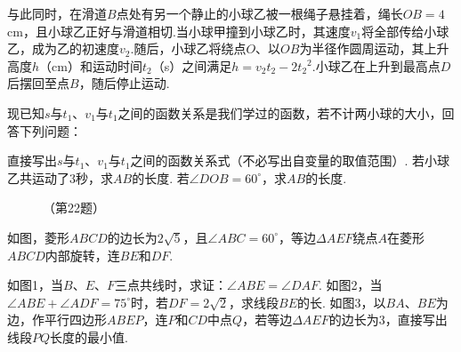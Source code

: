 \documentclass[10pt]{article}
\begin{document}
\begin{questions}{\answeringintroduction}
\begin{table}[!htbp]
    \end{table}\par
    \qquad 与此同时，在滑道$B$点处有另一个静止的小球乙被一根绳子悬挂着，绳长$OB=4$cm，且小球乙正好与滑道相切.当小球甲撞到小球乙时，其速度$v_1$将全部传给小球乙，成为乙的初速度$v_2$.随后，小球乙将绕点$O$、以$OB$为半径作圆周运动，其上升高度$h$（cm）和运动时间$t_2$（s）之间满足$h=v_2t_2-2{t_2}^2$.小球乙在上升到最高点$D$后摆回至点$B$，随后停止运动.\par
    \qquad 现已知$s$与$t_1$、$v_1$与$t_1$之间的函数关系是我们学过的函数，若不计两小球的大小，回答下列问题：
    \begin{subquestions}
        \subquestion 直接写出$s$与$t_1$、$v_1$与$t_1$之间的函数关系式（不必写出自变量的取值范围）.
        \subquestion 若小球乙共运动了$3$秒，求$AB$的长度.
        \subquestion 若$\angle DOB=60^{\circ}$，求$AB$的长度.
    \end{subquestions}
    \begin{figure}[!htbp]
        \centering
        \caption*{（第22题）}
    \end{figure}
    \question 如图，菱形$ABCD$的边长为$2\sqrt{5}$，且$\angle ABC=60^{\circ}$，等边$\Delta AEF$绕点$A$在菱形$ABCD$内部旋转，连$BE$和$DF$.
    \begin{subquestions}
        \subquestion 如图1，当$B$、$E$、$F$三点共线时，求证：$\angle ABE=\angle DAF$.
        \subquestion 如图2，当$\angle ABE+\angle ADF=75^{\circ}$时，若$DF=2\sqrt{2}$，求线段$BE$的长.
        \subquestion 如图3，以$BA$、$BE$为边，作平行四边形$ABEP$，连$P$和$CD$中点$Q$，若等边$\Delta AEF$的边长为$3$，直接写出线段$PQ$长度的最小值.

\end{subquestions}
\end{questions}
\end{document}
